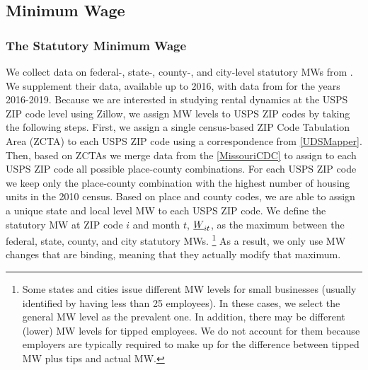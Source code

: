 \subsection{Minimum Wage}\label{sec:mw_construction}

\subsubsection*{The Statutory Minimum Wage}

We collect data on federal-, state-, county-, and city-level statutory MWs from 
\textcite{VaghulZipperer2016}.
We supplement their data, available up to 2016, with data from 
\textcite{BerkeleyLaborCenter} for the years 2016-2019. 
Because we are interested in studying rental dynamics at the USPS ZIP code level 
using Zillow, we assign MW levels to USPS ZIP codes by taking the following steps.
First, we assign a single census-based ZIP Code Tabulation Area (ZCTA) to each 
USPS ZIP code using a correspondence from \ref{UDSMapper}.
Then, based on ZCTAs we merge data from the \ref{MissouriCDC} to assign to each 
USPS ZIP code all possible place-county combinations.
For each USPS ZIP code we keep only the place-county combination with the 
highest number of housing units in the 2010 census.
Based on place and county codes, we are able to assign a unique state and local 
level MW to each USPS ZIP code. 
We define the statutory MW at ZIP code $i$ and month $t$, $\underline{W}_{it}$, as the 
maximum between the federal, state, county, and city statutory MWs.%
\footnote{Some states and cities issue different MW levels for small businesses
(usually identified by having less than 25 employees).
In these cases, we select the general MW level as the prevalent one.
In addition, there may be different (lower) MW levels for tipped employees.
We do not account for them because employers are typically required to make up 
for the difference between tipped MW plus tips and actual MW.}
%
%
As a result, we only use MW changes that are binding, meaning that they actually 
modify that maximum.

